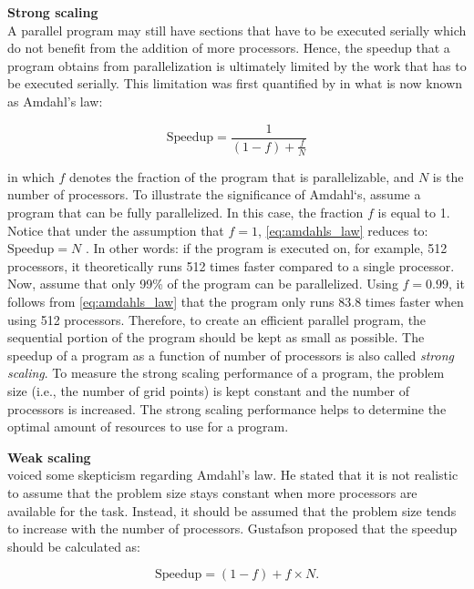 \medskip

\noindent \textbf{Strong scaling} \\
A parallel program may still have sections that have to be executed serially which do not benefit from the addition of more processors. Hence, the speedup that a program obtains from parallelization is ultimately limited by the work that has to be executed serially. This limitation was first quantified by \citet{amdahlValiditySingleProcessor1967} in what is now known as Amdahl's law: 

\begin{equation}
    \text{Speedup} = \frac{1}{(1-f) + \displaystyle \frac{f}{N}}
    \label{eq:amdahls_law}
\end{equation}

\noindent in which $f$ denotes the fraction of the program that is parallelizable, and $N$ is the number of processors. To illustrate the significance of Amdahl`s, assume a program that can be fully parallelized. In this case, the fraction $f$ is equal to 1. Notice that under the assumption that $f=1$, \autoref{eq:amdahls_law} reduces to: $\text{Speedup} = N$ . In other words: if the program is executed on, for example, 512 processors, it theoretically runs 512 times faster compared to a single processor. Now, assume that only 99\% of the program can be parallelized. Using $f=0.99$, it follows from \autoref{eq:amdahls_law} that the program only runs 83.8 times faster when using 512 processors. Therefore, to create an efficient parallel program, the sequential portion of the program should be kept as small as possible. The speedup of a program as a function of number of processors is also called \emph{strong scaling}. To measure the strong scaling performance of a program, the problem size (i.e., the number of grid points) is kept constant and the number of processors is increased. The strong scaling performance helps to determine the optimal amount of resources to use for a program.

\medskip

\noindent \textbf{Weak scaling} \\
\cite{gustafsonReevaluatingAmdahlLaw1988} voiced some skepticism regarding Amdahl's law. He stated that it is not realistic to assume that the problem size stays constant when more processors are available for the task. Instead, it should be assumed that the problem size tends to increase with the number of processors. Gustafson proposed that the speedup should be calculated as:

\begin{equation}
    \text{Speedup} = (1-f) + f \times N.
    \label{eq:gustafsons_law}
\end{equation}

